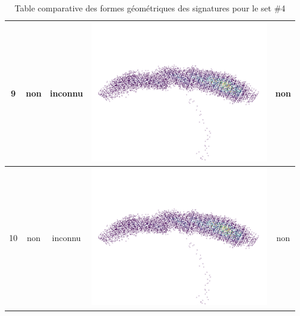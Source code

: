 \begin{table}[h]
\begin{tabular}{|c|c|c|c|c|}
\hline
9 & non & inconnu & \includegraphics[scale=0.25]{images/test1.png} & non \\
\hline
10 & non & inconnu & \includegraphics[scale=0.25]{images/test1.png}  & non \\
\hline
\end{tabular}
\caption{Table comparative des formes géométriques des signatures pour le set \#4}
\label{compa}
\end{table}